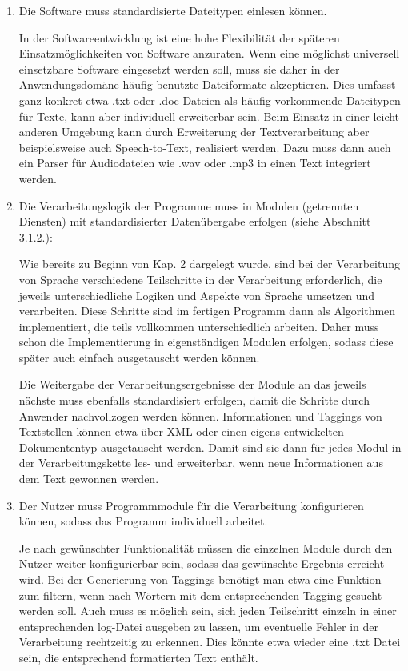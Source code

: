 \documentclass[12pt]{report}
\begin{document}
\begin{enumerate}
\item Die Software muss standardisierte Dateitypen einlesen können.

In der Softwareentwicklung ist eine hohe Flexibilität der späteren Einsatzmöglichkeiten von Software anzuraten. Wenn eine möglichst universell einsetzbare Software eingesetzt werden soll, muss sie daher in der Anwendungsdomäne häufig benutzte Dateiformate akzeptieren. Dies umfasst ganz konkret etwa .txt oder .doc Dateien als häufig vorkommende Dateitypen für Texte, kann aber individuell erweiterbar sein. Beim Einsatz in einer leicht anderen Umgebung kann durch Erweiterung der Textverarbeitung aber beispielsweise auch Speech-to-Text, realisiert werden. Dazu muss dann auch ein Parser für Audiodateien wie .wav oder .mp3  in einen Text integriert werden.

\item Die Verarbeitungslogik der Programme muss in Modulen (getrennten Diensten) mit standardisierter Datenübergabe erfolgen (siehe Abschnitt 3.1.2.): 

Wie bereits zu Beginn von Kap. 2 dargelegt wurde, sind bei der Verarbeitung von Sprache verschiedene Teilschritte in der Verarbeitung erforderlich, die jeweils unterschiedliche Logiken und Aspekte von Sprache umsetzen und verarbeiten. Diese Schritte sind im fertigen Programm dann als Algorithmen implementiert, die teils vollkommen unterschiedlich arbeiten. Daher muss schon die Implementierung in eigenständigen Modulen erfolgen, sodass diese später auch einfach ausgetauscht werden können.

Die Weitergabe der Verarbeitungsergebnisse der Module an das jeweils nächste muss ebenfalls standardisiert erfolgen, damit die Schritte durch Anwender nachvollzogen werden können. Informationen und Taggings von Textstellen können etwa über XML oder einen eigens entwickelten Dokumententyp ausgetauscht werden. Damit sind sie dann für jedes Modul in der Verarbeitungskette les- und erweiterbar, wenn neue Informationen aus dem Text gewonnen werden.

\item Der Nutzer muss Programmmodule für die Verarbeitung konfigurieren können, sodass das Programm individuell arbeitet.

Je nach gewünschter Funktionalität müssen die einzelnen Module durch den Nutzer weiter konfigurierbar sein, sodass das gewünschte Ergebnis erreicht wird. Bei der Generierung von Taggings benötigt man etwa eine Funktion zum filtern, wenn nach Wörtern mit dem entsprechenden Tagging gesucht werden soll. Auch muss es möglich sein, sich jeden Teilschritt einzeln in einer entsprechenden log-Datei ausgeben zu lassen, um eventuelle Fehler in der Verarbeitung rechtzeitig zu erkennen. Dies könnte etwa wieder eine .txt Datei sein, die entsprechend formatierten Text enthält.


\end{enumerate}
\end{document}
